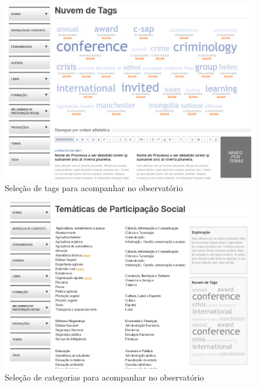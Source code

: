 \documentclass[12pt]{article}
\begin{document}
\begin{figure}[h]
\center
\includegraphics[scale=0.4]{observatorio-tags.png}
\caption{Seleção de tags para acompanhar no observatório}
\label{observatorio-tags}
\end{figure}

\begin{figure}[h]
\center
\includegraphics[scale=0.4]{observatorio-categorias.png}
\caption{Seleção de categorias para acompanhar no observatório}
\label{observatorio-categorias}
\end{figure}
\end{document}

